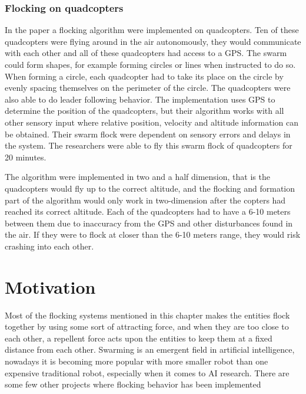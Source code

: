 \subsubsection{Flocking on quadcopters}
In the paper \citep{Csaba2014} a flocking algorithm were implemented on quadcopters. Ten of these quadcopters were flying around in the air autonomously, they would communicate with each other and all of these quadcopters had access to a GPS.
The swarm could form shapes, for example forming circles or lines when instructed to do so. When forming a circle, each quadcopter had to take its place on the circle by evenly spacing themselves on the perimeter of the circle. The quadcopters were also able to do leader following behavior.
The implementation uses GPS to determine the position of the quadcopters, but their algorithm works with all other sensory input where relative position, velocity and altitude information can be obtained. Their swarm flock were dependent on sensory errors and delays in the system. The researchers were able to fly this swarm flock of quadcopters for 20 minutes.

The algorithm were implemented in two and a half dimension, that is the quadcopters would fly up to the correct altitude, and the flocking and formation part of the algorithm would only work in two-dimension after the copters had reached its correct altitude. Each of the quadcopters had to have a 6-10 meters between them due to inaccuracy from the GPS and other disturbances found in the air. If they were to flock at closer than the 6-10 meters range, they would risk crashing into each other.




\section{Motivation}
\label{sec:motivation}
Most of the flocking systems mentioned in this chapter makes the entities flock together by using some sort of attracting force, and when they are too close to each other, a repellent force acts upon the entities to keep them at a fixed distance from each other.
Swarming is an emergent field in artificial intelligence, nowadays it is becoming more popular with more smaller robot than one expensive traditional robot, especially when it comes to AI research. There are some few other projects where flocking behavior has been implemented 

